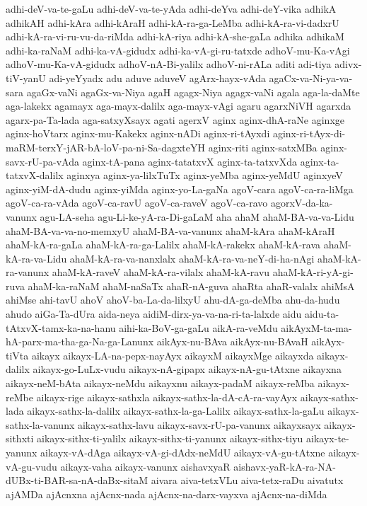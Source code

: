 {adhi-deV-va-te-gaLu
adhi-deV-va-te-yAda
adhi-deYva
adhi-deY-vika
adhikA
adhikAH
adhi-kAra
adhi-kAraH
adhi-kA-ra-ga-LeMba
adhi-kA-ra-vi-dadxrU
adhi-kA-ra-vi-ru-vu-da-riMda
adhi-kA-riya
adhi-kA-she-gaLa
adhika
adhikaM
adhi-ka-raNaM
adhi-ka-vA-gidudx
adhi-ka-vA-gi-ru-tatxde
adhoV-mu-Ka-vAgi
adhoV-mu-Ka-vA-gidudx
adhoV-nA-Bi-yalilx
adhoV-ni-rALa
aditi
adi-tiya
adivx-tiV-yanU
adi-yeYyadx
adu
aduve
aduveV
agArx-hayx-vAda
agaCx-va-Ni-ya-va-sara
agaGx-vaNi
agaGx-va-Niya
agaH
agagx-Niya
agagx-vaNi
agala
aga-la-daMte
aga-lakekx
agamayx
aga-mayx-dalilx
aga-mayx-vAgi
agaru
agarxNiVH
agarxda
agarx-pa-Ta-lada
aga-satxyXsayx
agati
agerxV
aginx
aginx-dhA-raNe
aginxge
aginx-hoVtarx
aginx-mu-Kakekx
aginx-nADi
aginx-ri-tAyxdi
aginx-ri-tAyx-di-maRM-terxY-jAR-bA-loV-pa-ni-Sa-dagxteYH
aginx-riti
aginx-satxMBa
aginx-savx-rU-pa-vAda
aginx-tA-pana
aginx-tatatxvX
aginx-ta-tatxvXda
aginx-ta-tatxvX-dalilx
aginxya
aginx-ya-lilxTuTx
aginx-yeMba
aginx-yeMdU
aginxyeV
aginx-yiM-dA-dudu
aginx-yiMda
aginx-yo-La-gaNa
agoV-cara
agoV-ca-ra-liMga
agoV-ca-ra-vAda
agoV-ca-ravU
agoV-ca-raveV
agoV-ca-ravo
agorxV-da-ka-vanunx
agu-LA-seha
agu-Li-ke-yA-ra-Di-gaLaM
aha
ahaM
ahaM-BA-va-va-Lidu
ahaM-BA-va-va-no-memxyU
ahaM-BA-va-vanunx
ahaM-kAra
ahaM-kAraH
ahaM-kA-ra-gaLa
ahaM-kA-ra-ga-Lalilx
ahaM-kA-rakekx
ahaM-kA-rava
ahaM-kA-ra-va-Lidu
ahaM-kA-ra-va-nanxlalx
ahaM-kA-ra-va-neY-di-ha-nAgi
ahaM-kA-ra-vanunx
ahaM-kA-raveV
ahaM-kA-ra-vilalx
ahaM-kA-ravu
ahaM-kA-ri-yA-gi-ruva
ahaM-ka-raNaM
ahaM-naSaTx
ahaR-nA-guva
ahaRta
ahaR-valalx
ahiMsA
ahiMse
ahi-tavU
ahoV
ahoV-ba-La-da-lilxyU
ahu-dA-ga-deMba
ahu-da-hudu
ahudo
aiGa-Ta-dUra
aida-neya
aidiM-dirx-ya-va-na-ri-ta-lalxde
aidu
aidu-ta-tAtxvX-tamx-ka-na-hanu
aihi-ka-BoV-ga-gaLu
aikA-ra-veMdu
aikAyxM-ta-ma-hA-parx-ma-tha-ga-Na-ga-Lanunx
aikAyx-nu-BAva
aikAyx-nu-BAvaH
aikAyx-tiVta
aikayx
aikayx-LA-na-pepx-nayAyx
aikayxM
aikayxMge
aikayxda
aikayx-dalilx
aikayx-go-LuLx-vudu
aikayx-nA-gipapx
aikayx-nA-gu-tAtxne
aikayxna
aikayx-neM-bAta
aikayx-neMdu
aikayxnu
aikayx-padaM
aikayx-reMba
aikayx-reMbe
aikayx-rige
aikayx-sathxla
aikayx-sathx-la-dA-cA-ra-vayAyx
aikayx-sathx-lada
aikayx-sathx-la-dalilx
aikayx-sathx-la-ga-Lalilx
aikayx-sathx-la-gaLu
aikayx-sathx-la-vanunx
aikayx-sathx-lavu
aikayx-savx-rU-pa-vanunx
aikayxsayx
aikayx-sithxti
aikayx-sithx-ti-yalilx
aikayx-sithx-ti-yanunx
aikayx-sithx-tiyu
aikayx-te-yanunx
aikayx-vA-dAga
aikayx-vA-gi-dAdx-neMdU
aikayx-vA-gu-tAtxne
aikayx-vA-gu-vudu
aikayx-vaha
aikayx-vanunx
aishavxyaR
aishavx-yaR-kA-ra-NA-dUBx-ti-BAR-sa-nA-daBx-sitaM
aivara
aiva-tetxVLu
aiva-tetx-raDu
aivatutx
ajAMDa
ajAcnxna
ajAcnx-nada
ajAcnx-na-darx-vayxva
ajAcnx-na-diMda
}
